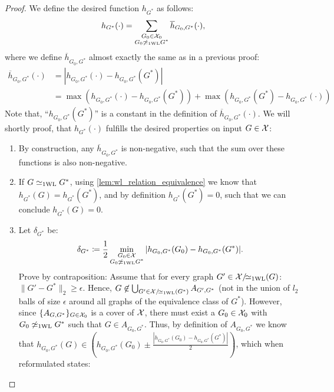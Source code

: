 \begin{proof}
    We define the desired function $h_{G^*}$ as follows:
    \begin{equation}\label{eq:continuous_proof4}
        h_{G^*}(\cdot) = \sum_{\substack{G_0 \in \mathcal{X}_0 \\ G_0 \not\simeq_{\text{1WL}} G^*}} \overline{h}_{G_0, G^*}(\cdot),
    \end{equation}
    where we define $\overline{h}_{G_0, G^*}$ almost exactly the same as in a previous proof:
    \begin{align}
        \overline{h}_{G_0, G^*}(\cdot) &= |h_{G_0, G^*}(\cdot) - h_{G_0, G^*}(G^*)| \\
        &= \max(h_{G_0, G^*}(\cdot) - h_{G_0, G^*}(G^*)) + \max(h_{G_0, G^*}(G^*) - h_{G_0, G^*}(\cdot))\label{eq:continuous_proof5}
    \end{align}
    Note that, ``$ h_{G_0, G^*}(G^*)$'' is a constant in the definition of $\overline{h}_{G_0, G^*}(\cdot)$. We will shortly proof, that $h_{G^*}(\cdot)$ fulfills the desired properties on input $G \in \mathcal{X}$:
    \begin{enumerate}
        \item By construction, any $\overline{h}_{G_0, G^*}$ is non-negative, such that the sum over these functions is also non-negative.
        \item If $G \simeq_{\text{1WL}} G^*$, using \cref{lem:wl_relation_equivalence} we know that $h_{G^*}(G) = h_{G^*}(G^*)$, and by definition $h_{G^*}(G^*) = 0$, such that we can conclude $h_{G^*}(G)=0$.
        \item Let $\delta_{G^*}$ be:
        \begin{equation*}
            \delta_{G^*} \coloneqq \frac{1}{2} \min_{\substack{G_0 \in \mathcal{X}\\G_0 \not\simeq_{\text{1WL}} G^*}} |h_{G_0, G^*}(G_0) - h_{G_0, G^*}(G^*)|.
        \end{equation*}
        Prove by contraposition: Assume that for every graph $G' \in \mathcal{X}/\!{\simeq_{\text{1WL}}}(G)$: $\| G' - G^* \|_2 \geq \epsilon$. Hence, $G \not\in \bigcup_{G' \in \mathcal{X}/\!{\simeq_{\text{1WL}}}(G^*)} A_{G', G^*}$ (not in the union of $l_2$ balls of size $\epsilon$ around all graphs of the equivalence class of $G^*$). However, since $\{ A_{G, G^*} \}_{G \in \mathcal{X}_0}$ is a cover of $\mathcal{X}$, there must exist a $G_0 \in \mathcal{X}_0$ with $G_0 \not\simeq_{\text{1WL}} G^*$ such that $G \in A_{G_0, G^*}$. Thus, by definition of $A_{G_0, G^*}$ we know that $h_{G_0, G^*}(G) \in (h_{G_0, G^*}(G_0) \pm \frac{|h_{G_0, G^*}(G_0) - h_{G_0, G^*}(G^*)|}{2})$, which when reformulated states:
        \begin{equation}\label{eq:continuous_proof3}

\end{equation}
\end{enumerate}
\end{proof}
